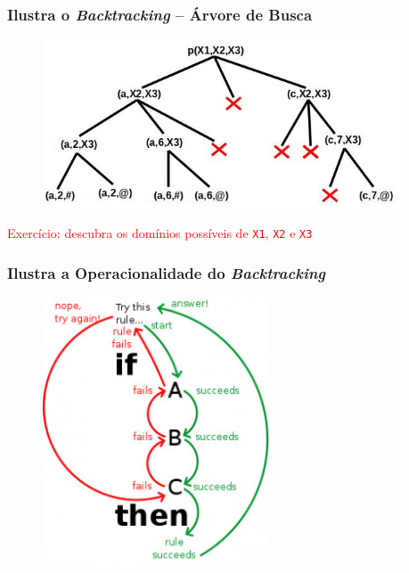 \begin{frame}[fragile]
\frametitle{Ilustra o \textit{Backtracking} -- Árvore de Busca}

\begin{figure}[!htb]
\begin{center}
\includegraphics[width=0.950\textwidth, height=0.8\textheight]{figures/ilustra_backtracking_03.jpg}
\end{center}
\end{figure}
\textcolor{red}{Exercício: descubra os domínios possíveis de \texttt{X1}, \texttt{X2} e \texttt{X3}}
\end{frame}


\begin{frame}[fragile]
\frametitle{Ilustra a Operacionalidade do \textit{Backtracking}}

\begin{figure}[!htb]
\begin{center}
\includegraphics[width=0.60\textwidth, height=0.75\textheight]{figures/ilustra_backtracking_02.jpg}

\end{center}
\end{figure}

\end{frame}

